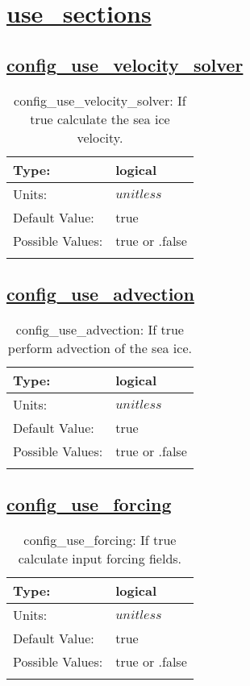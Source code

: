 \section[use\_sections]{\hyperref[sec:nm_tab_use_sections]{use\_sections}}
\label{sec:nm_sec_use_sections}
\subsection[config\_use\_velocity\_solver]{\hyperref[sec:nm_tab_use_sections]{config\_use\_velocity\_solver}}
\label{subsec:nm_sec_config_use_velocity_solver}
\begin{center}
\begin{longtable}{| p{2.0in} || p{4.0in} |}
    \hline
    Type: & logical \\
    \hline
    Units: & $unitless$ \\
    \hline
    Default Value: & true \\
    \hline
    Possible Values: & true or .false \\
    \hline
    \caption{config\_use\_velocity\_solver: If true calculate the sea ice velocity.}
\end{longtable}
\end{center}
\subsection[config\_use\_advection]{\hyperref[sec:nm_tab_use_sections]{config\_use\_advection}}
\label{subsec:nm_sec_config_use_advection}
\begin{center}
\begin{longtable}{| p{2.0in} || p{4.0in} |}
    \hline
    Type: & logical \\
    \hline
    Units: & $unitless$ \\
    \hline
    Default Value: & true \\
    \hline
    Possible Values: & true or .false \\
    \hline
    \caption{config\_use\_advection: If true perform advection of the sea ice.}
\end{longtable}
\end{center}
\subsection[config\_use\_forcing]{\hyperref[sec:nm_tab_use_sections]{config\_use\_forcing}}
\label{subsec:nm_sec_config_use_forcing}
\begin{center}
\begin{longtable}{| p{2.0in} || p{4.0in} |}
    \hline
    Type: & logical \\
    \hline
    Units: & $unitless$ \\
    \hline
    Default Value: & true \\
    \hline
    Possible Values: & true or .false \\
    \hline
    \caption{config\_use\_forcing: If true calculate input forcing fields.}
\end{longtable}
\end{center}
